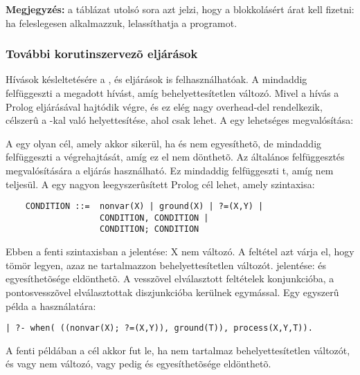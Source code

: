 {\bf Megjegyzés:} a táblázat utolsó sora azt jelzi, hogy a
blokkolásért árat kell fizetni: ha feleslegesen alkalmazzuk,
lelassíthatja a programot.

\subsubsection{További korutinszervezõ eljárások}

Hívások késleltetésére a ,  és  eljárások
is felhasználhatóak. A  mindaddig felfüggeszti a
megadott hívást, amíg  behelyettesítetlen változó. Mivel a hívás a
Prolog  eljárásával hajtódik végre, és ez elég nagy overhead-del
rendelkezik, célszerû a  -kal való helyettesítése, ahol
csak lehet. A  egy lehetséges megvalósítása:


A 
egy olyan cél, amely akkor sikerül, ha  és  nem egyesíthetõ, de
mindaddig felfüggeszti a végrehajtását, amíg ez el nem dönthetõ. Az általános
felfüggesztés megvalósítására a  eljárás használható.
Ez mindaddig felfüggeszti t, amíg  nem teljesül. A
 egy nagyon leegyszerûsített Prolog cél lehet, amely szintaxisa:

\begin{verbatim}
    CONDITION ::=  nonvar(X) | ground(X) | ?=(X,Y) |
                   CONDITION, CONDITION |
                   CONDITION; CONDITION
\end{verbatim}

Ebben a fenti szintaxisban a  jelentése: X nem változó. A
 feltétel azt várja el, hogy  tömör legyen, azaz ne
tartalmazzon behelyettesítetlen változót.  jelentése:
 és  egyesíthetõsége eldönthetõ. A vesszõvel elválasztott
feltételek konjunkcióba, a pontosvesszõvel elválasztottak diszjunkcióba
kerülnek egymással. Egy egyszerû példa a  használatára:

\begin{verbatim}
| ?- when( ((nonvar(X); ?=(X,Y)), ground(T)), process(X,Y,T)).
\end{verbatim}

A fenti példában a  cél akkor fut le, ha  nem
tartalmaz behelyettesítetlen változót, és vagy  nem változó, vagy
pedig  és  egyesíthetõsége eldönthetõ.

